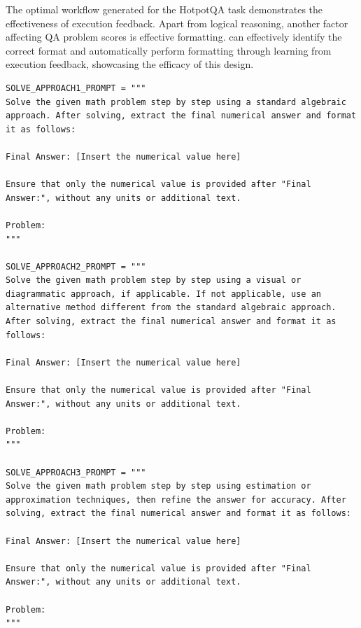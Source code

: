 The optimal workflow generated for the HotpotQA task demonstrates the effectiveness of execution feedback. Apart from logical reasoning, another factor affecting QA problem scores is effective formatting. \model can effectively identify the correct format and automatically perform formatting through learning from execution feedback, showcasing the efficacy of this design.

\begin{tcolorbox}[title={\textbf{\small An ensemble structure that emerged in the GSM8K ablation experiment}}, boxrule=1pt, arc=0mm, colback=black!5!white, colframe=black!75!white, breakable, before skip=10pt, after skip=10pt, pad at break=2mm, parbox=false] \begin{verbatim}
SOLVE_APPROACH1_PROMPT = """
Solve the given math problem step by step using a standard algebraic approach. After solving, extract the final numerical answer and format it as follows:

Final Answer: [Insert the numerical value here]

Ensure that only the numerical value is provided after "Final Answer:", without any units or additional text.

Problem:
"""

SOLVE_APPROACH2_PROMPT = """
Solve the given math problem step by step using a visual or diagrammatic approach, if applicable. If not applicable, use an alternative method different from the standard algebraic approach. After solving, extract the final numerical answer and format it as follows:

Final Answer: [Insert the numerical value here]

Ensure that only the numerical value is provided after "Final Answer:", without any units or additional text.

Problem:
"""

SOLVE_APPROACH3_PROMPT = """
Solve the given math problem step by step using estimation or approximation techniques, then refine the answer for accuracy. After solving, extract the final numerical answer and format it as follows:

Final Answer: [Insert the numerical value here]

Ensure that only the numerical value is provided after "Final Answer:", without any units or additional text.

Problem:
"""


\end{verbatim}
\end{tcolorbox}
